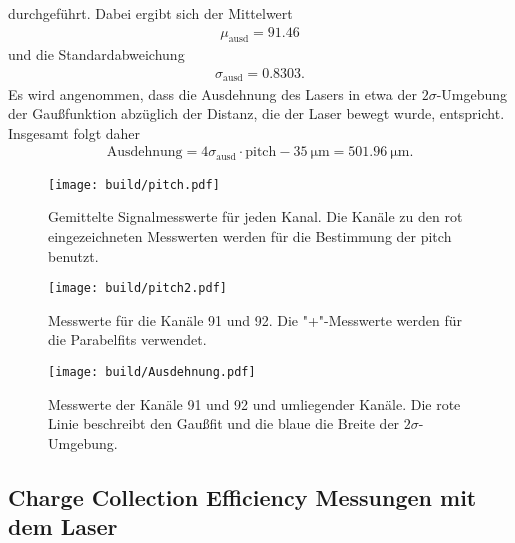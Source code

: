 durchgeführt. Dabei ergibt sich der Mittelwert
\begin{align}
  \mu_\text{ausd} = 91.46
\end{align}
und die Standardabweichung
\begin{align}
  \sigma_\text{ausd} = 0.8303.
\end{align}
Es wird angenommen, dass die Ausdehnung des Lasers in etwa der $2\sigma$-Umgebung der Gaußfunktion abzüglich der Distanz, die der Laser bewegt wurde, entspricht.
Insgesamt folgt daher
\begin{align}
  \text{Ausdehnung} = 4\sigma_\text{ausd} \cdot \text{pitch} - \SI{35}{\micro\meter} = \SI{501.96}{\micro\meter}.
\end{align}

\begin{figure}
  \centering
  \texttt{[image: build/pitch.pdf]}
  \caption{Gemittelte Signalmesswerte für jeden Kanal. Die Kanäle zu den rot eingezeichneten Messwerten werden für die Bestimmung der pitch benutzt.}
  \label{fig:pitch}
\end{figure}

\begin{figure}
  \centering
  \texttt{[image: build/pitch2.pdf]}
  \caption{Messwerte für die Kanäle 91 und 92. Die "+"-Messwerte werden für die Parabelfits verwendet.}
  \label{fig:pitch2}
\end{figure}

\begin{figure}
  \centering
  \texttt{[image: build/Ausdehnung.pdf]}
  \caption{Messwerte der Kanäle 91 und 92 und umliegender Kanäle. Die rote Linie beschreibt den Gaußfit und die blaue die Breite der $2\sigma$-Umgebung.}
  \label{fig:Ausdehnung}
\end{figure}

\subsection{Charge Collection Efficiency Messungen mit dem Laser}

